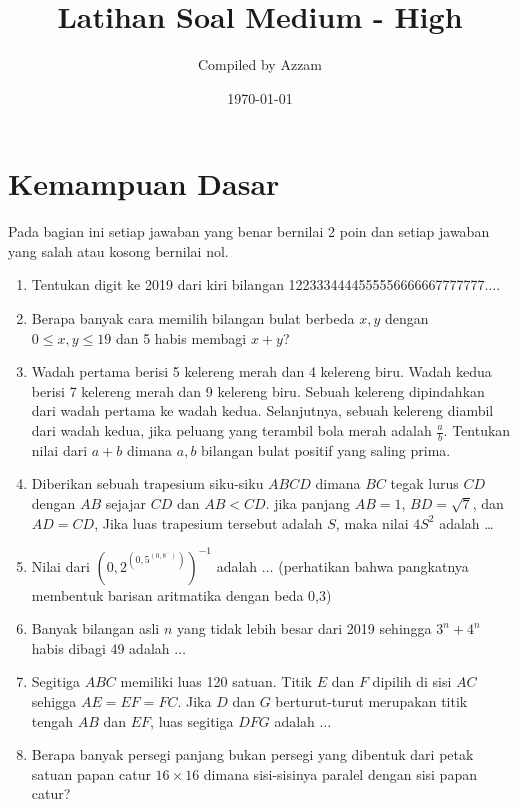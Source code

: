 \documentclass[11pt]{scrartcl}
\begin{document}
	\title{Latihan Soal Medium - High} %
	\date{\today}
	\author{Compiled by Azzam}
	\maketitle
	\section{Kemampuan Dasar}
	Pada bagian ini setiap jawaban yang benar bernilai 2 poin dan setiap jawaban yang salah
	atau kosong bernilai nol.
	\begin{enumerate}
		\item
		Tentukan digit ke 2019 dari kiri bilangan 1223334444555556666667777777....
		
		\item
		Berapa banyak cara memilih bilangan bulat berbeda $x, y$ dengan $0 \le x, y \le 19$ dan 5 habis membagi $x + y$?
		
		\item
		Wadah pertama berisi 5 kelereng merah dan 4 kelereng biru. Wadah kedua berisi 7 kelereng merah dan
		9 kelereng biru. Sebuah kelereng dipindahkan dari wadah pertama ke wadah kedua. Selanjutnya, sebuah
		kelereng diambil dari wadah kedua, jika peluang yang terambil bola merah adalah
		$\frac{a}{b}$. Tentukan nilai dari $a+b$ dimana $a, b$ bilangan bulat positif yang saling prima.
		
		\item
		Diberikan sebuah trapesium siku-siku $ABCD$ dimana $BC$ tegak lurus $CD$ dengan $AB$ sejajar $CD$ dan $AB < CD$. jika panjang $AB = 1$, $BD = \sqrt{7}$, dan $AD = CD$, Jika luas trapesium tersebut adalah $S$, maka nilai $4S^2$ adalah \dots
		
		\item Nilai dari $\left(0,2 ^{\left(0,5 ^{\left(0,8 ^{...} \right)} \right)} \right)^{-1}$ adalah $\dots$ (perhatikan bahwa pangkatnya membentuk barisan aritmatika dengan beda 0,3)
		
		\item Banyak bilangan asli $n$ yang tidak lebih besar dari 2019 sehingga $3^n+4^n$ habis dibagi 49 adalah $\dots$
		
		\item Segitiga $ABC$ memiliki luas 120 satuan. Titik $E$ dan $F$ dipilih di sisi $AC$ sehigga $AE=EF=FC$. Jika $D$ dan $G$ berturut-turut merupakan titik tengah $AB$ dan $EF$, luas segitiga $DFG$ adalah $\dots$
		
		\item
		Berapa banyak persegi panjang bukan persegi yang dibentuk dari petak satuan papan catur $16 \times 16$ dimana sisi-sisinya paralel dengan sisi papan catur?
		
	\end{enumerate}
\end{document}

